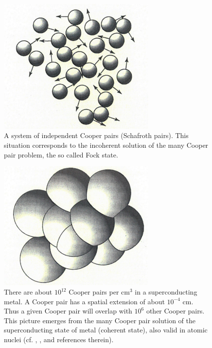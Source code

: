 \begin{figure}
\centerline{\includegraphics*[width=0.7\textwidth,angle=0]{nutshell/figs/fig1A4.pdf}}
\caption{A system of independent Cooper pairs (Schafroth pairs). This situation corresponds to the incoherent solution of the many Cooper pair problem, the so called Fock state.}\label{fig1A4}
\end{figure}
\begin{figure}
\centerline{\includegraphics*[width=0.7\textwidth,angle=0]{nutshell/figs/fig1A5.pdf}}
\caption{There are about $10^{12}$ Cooper pairs per cm$^{3}$ in a superconducting metal. A Cooper pair has a spatial extension of about $10^{-4}$ cm. Thus a given Cooper pair will overlap with  $10^{6}$ other Cooper pairs. This picture emerges from  the many Cooper pair solution of the superconducting state of metal  (coherent state), also valid in atomic nuclei (cf. \cite{Schrieffer:64}, \cite{Brink:05}, and references therein).}\label{fig1A5}
\end{figure}
